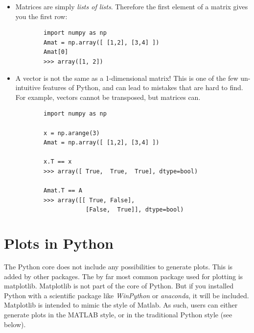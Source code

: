\begin{itemize}
  \item Matrices are simply \emph{lists of lists}. Therefore the first element of a matrix gives you the first row:
    \begin{lstlisting}
        import numpy as np
        Amat = np.array([ [1,2], [3,4] ])
        Amat[0]
        >>> array([1, 2])
    \end{lstlisting}
  \item A vector is not the same as a 1-dimensional matrix! This is one of the few un-intuitive features of Python, and can lead to mistakes that are hard to find. For example, vectors cannot be transposed, but matrices can.
      \begin{lstlisting}
        import numpy as np

        x = np.arange(3)
        Amat = np.array([ [1,2], [3,4] ])

        x.T == x
        >>> array([ True,  True,  True], dtype=bool)

        Amat.T == A
        >>> array([[ True, False],
                    [False,  True]], dtype=bool)
    \end{lstlisting}
\end{itemize}

\section{Plots in Python}

The Python core does not include any possibilities to generate plots. This is added by other packages. The by far most common package used for plotting is \Gls{matplotlib}. Matplotlib is not part of the core of Python. But if you installed Python with a scientific package like \emph{WinPython} or \emph{anaconda}, it will be included. Matplotlib is intended to mimic the style of Matlab. As such, users can either generate plots in the MATLAB style, or in the traditional Python style (see below).

